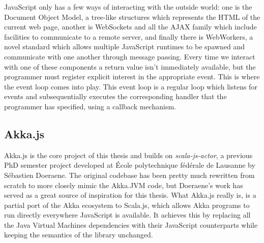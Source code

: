 \documentclass{sig-alternate}
\begin{document}
JavaScript only has a few ways of interacting with the outside world: one is the Document Object Model, a tree-like structures which represents the HTML of the current web page, another is WebSockets and all the AJAX family which include facilities to communicate to a remote server, and finally there is WebWorkers, a novel standard which allows multiple JavaScript runtimes to be spawned and communicate with one another through message passing.
Every time we interact with one of these components a return value isn't immediately available, but the programmer must register explicit interest in the appropriate event. This is where the event loop comes into play. This event loop is a regular loop which listens for events and subsequentially executes the corresponding handler that the programmer has specified, using a callback mechanism.

\subsection{Akka.js}

Akka.js is the core project of this thesis and builds on \textit{scala-js-actor}, a previous PhD 
semester project developed at École polytechnique fédérale de Lausanne by Sébastien Doeraene. 
The original codebase has been pretty much rewritten from scratch to more closely mimic the 
Akka.JVM code, but Doeraene's work has served as a great source of inspiration for this thesis.
What Akka.js really is, is a partial port of the Akka ecosystem to Scala.js, which allows 
Akka programs to run directly everywhere JavaScript is available. It achieves this by 
replacing all the Java Virtual Machines dependencies with their JavaScript counterparts 
while keeping the semantics of the library unchanged.
\\\\
\end{document}
